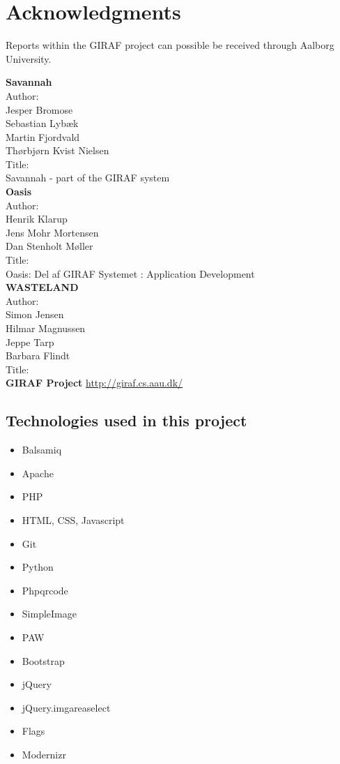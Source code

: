 \chapter{Acknowledgments}
\label{acknowledgement}
Reports within the GIRAF project can possible be received through Aalborg University.   

\textbf{Savannah}\\
Author:\\ 
Jesper Bromose\\
Sebastian Lybæk\\
Martin Fjordvald\\
Thørbjørn Kvist Nielsen\\

Title:\\
Savannah - part of the GIRAF system\\

\textbf{Oasis}\\
Author:\\
Henrik Klarup\\
Jens Mohr Mortensen\\
Dan Stenholt Møller\\

Title:\\
Oasis: Del af GIRAF Systemet : Application Development\\


\textbf{WASTELAND}\\
Author:\\
Simon Jensen\\
Hilmar Magnussen\\
Jeppe Tarp\\
Barbara Flindt\\
Title:\\

\textbf{GIRAF Project}
\url{http://giraf.cs.aau.dk/}\\

\section{Technologies used in this project}
\begin{itemize}
\item Balsamiq
\item Apache
\item PHP
\item HTML, CSS, Javascript
\item Git
\item Python
\item Phpqrcode
\item SimpleImage
\item PAW
\item Bootstrap
\item jQuery
\item jQuery.imgareaselect
\item Flags
\item Modernizr
\end{itemize}